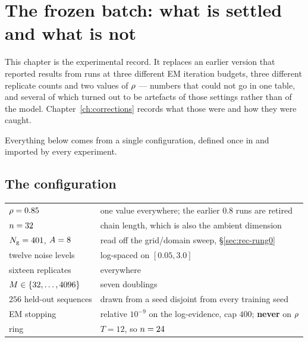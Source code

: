\chapter{The frozen batch: what is settled and what is not}
\label{ch:status}

This chapter is the experimental record. It replaces an earlier version that reported results
from runs at three different EM iteration budgets, three different replicate counts and two
values of $\rho$ --- numbers that could not go in one table, and several of which turned out to
be artefacts of those settings rather than of the model. Chapter~\ref{ch:corrections} records
what those were and how they were caught.

Everything below comes from a single configuration, defined once in
 and imported by every experiment.

\section{The configuration}

\begin{center}\small
\begin{tabular}{@{}ll@{}}
\toprule
$\rho = 0.85$ & one value everywhere; the earlier $0.8$ runs are retired \\
$n = 32$ & chain length, which is also the ambient dimension \\
$N_{\mathrm{g}} = 401$, $A = 8$ & read off the grid/domain sweep, \S\ref{sec:rec-rung0} \\
twelve noise levels & log-spaced on $[0.05, 3.0]$ \\
sixteen replicates & everywhere \\
$M \in \{32,\dots,4096\}$ & seven doublings \\
$256$ held-out sequences & drawn from a seed disjoint from every training seed \\
EM stopping & relative $10^{-9}$ on the log-evidence, cap $400$; \textbf{never} on $\rho$ \\
ring & $T = 12$, so $n = 24$ \\
\bottomrule
\end{tabular}
\end{center}

